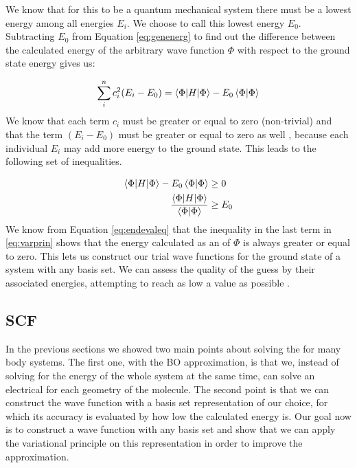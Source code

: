 \documentclass[../master_thesis.tex]{subfiles}
\begin{document}
We know that for this to be a quantum mechanical system there must be a lowest
energy among all energies $E_i$. We choose to call this lowest energy $E_0$.
Subtracting $E_0$ from Equation \ref{eq:genenerg} to find out the difference
between the calculated energy of the arbitrary wave function $\Phi$ with respect
to the ground state energy gives us:

\begin{equation}
   \sum\limits_i^nc_i^2(E_i - E_0) = \braket{\Phi | H | \Phi} -
   E_0\braket{\Phi | \Phi}
\end{equation}
We know that each term $c_i$ must be greater or equal to zero (non-trivial) and
that the term $(E_i - E_0)$ must be greater or equal to zero as well
\cite{Cramer:2004}, because each individual $E_i$ may add more energy to the
ground state. This leads to the following set of inequalities.

\begin{equation}
  \begin{split} \label{eq:varprin}
    \braket{\Phi | H | \Phi} - E_0\braket{\Phi | \Phi} & \geq 0 \\
    \frac{\braket{\Phi | H | \Phi}}{\braket{\Phi | \Phi}} & \geq E_0
  \end{split}
\end{equation}
We know from Equation \ref{eq:endevaleq} that the inequality in the last term in
\ref{eq:varprin} shows that the energy calculated as an \eival of $\Phi$ is
always greater or equal to zero. This lets us construct our trial wave functions
for the ground state of a system with any basis set. We can assess the quality
of the guess by their associated energies, attempting to reach as low a value
as possible \cite{Cramer:2004}.

\subsection{\ac{SCF}}
In the previous sections we showed two main points about solving the \SE for
many body systems. The first one, with the \ac{BO} approximation, is that we,
instead of solving for the energy of the whole system at the same time, can solve an electrical
\SE for each geometry of the molecule. The second point is that we can construct
the wave function with a basis set representation of our choice, for which its
accuracy is evaluated by how low the calculated energy is.
Our goal now is to construct a wave function with any basis set and show that we
can apply the variational principle on this representation in order to improve
the approximation.
\end{document}
